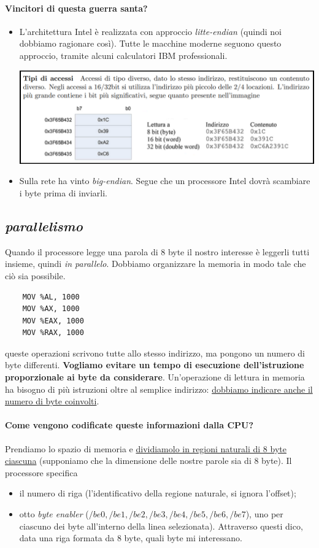 \paragraph{Vincitori di questa guerra santa?} 
\begin{itemize}
	\item L'architettura Intel è realizzata con approccio \emph{litte-endian} (quindi noi dobbiamo ragionare così). Tutte le macchine moderne seguono questo approccio, tramite alcuni calculatori IBM professionali.
	\begin{center}
		\includegraphics[scale=.65]{img/133.PNG}
	\end{center}
	\item Sulla rete ha vinto \emph{big-endian}.  Segue che un processore Intel dovrà scambiare i byte prima di inviarli.
\end{itemize}

\subsection{\emph{parallelismo}}
Quando il processore legge una parola di 8 byte il nostro interesse è leggerli tutti insieme, quindi \emph{in parallelo}. Dobbiamo organizzare la memoria in modo tale che ciò sia possibile.  
\begin{verbatim}
	MOV %AL, 1000
	MOV %AX, 1000
	MOV %EAX, 1000
	MOV %RAX, 1000
\end{verbatim}
queste operazioni scrivono tutte allo stesso indirizzo, ma pongono un numero di byte differenti. \textbf{Vogliamo evitare un tempo di esecuzione dell'istruzione proporzionale ai byte da considerare}. Un'operazione di lettura in memoria ha bisogno di più istruzioni oltre al semplice indirizzo: \underline{dobbiamo indicare anche il numero di byte coinvolti}.
\paragraph{Come vengono codificate queste informazioni dalla CPU?} Prendiamo lo spazio di memoria e \underline{dividiamolo in regioni naturali di 8 byte ciascuna} (supponiamo che la dimensione delle nostre parole sia di 8 byte). Il processore specifica 
\begin{itemize}
	\item il numero di riga (l'identificativo della regione naturale, si ignora l'offset);
	\item otto \emph{byte enabler} ($/be0, /be1, /be2, /be3, /be4, /be5, /be6, /be7$), uno per ciascuno dei byte all'interno della linea selezionata). Attraverso questi dico, data una riga formata da 8 byte, quali byte mi interessano.
\end{itemize}
